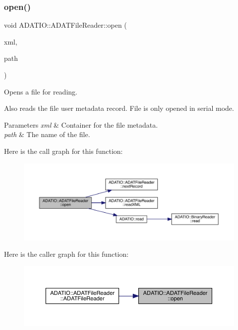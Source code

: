 \subsubsection{\texorpdfstring{open()}{open()}}
{\footnotesize\ttfamily void A\+D\+A\+T\+I\+O\+::\+A\+D\+A\+T\+File\+Reader\+::open (\begin{DoxyParamCaption}\item[{\mbox{\hyperlink{classADATXML_1_1XMLReader}{X\+M\+L\+Reader}} \&}]{xml,  }\item[{const std\+::string \&}]{path }\end{DoxyParamCaption})}



Opens a file for reading. 

Also reads the file user metadata record. File is only opened in serial mode. 
\begin{DoxyParams}{Parameters}
{\em xml} & Container for the file metadata. \\
\hline
{\em path} & The name of the file. \\
\hline
\end{DoxyParams}
Here is the call graph for this function\+:\nopagebreak
\begin{figure}[H]
\begin{center}
\leavevmode
\includegraphics[width=350pt]{db/de5/group__qio_ga2b2ac967129dfd2d61a79e36034b400f_cgraph}
\end{center}
\end{figure}
Here is the caller graph for this function\+:\nopagebreak
\begin{figure}[H]
\begin{center}
\leavevmode
\includegraphics[width=350pt]{db/de5/group__qio_ga2b2ac967129dfd2d61a79e36034b400f_icgraph}
\end{center}
\end{figure}
\mbox{\label{group__qio_gac92ce1b0fee7c00b8a7dc988f3d4906e}} 
